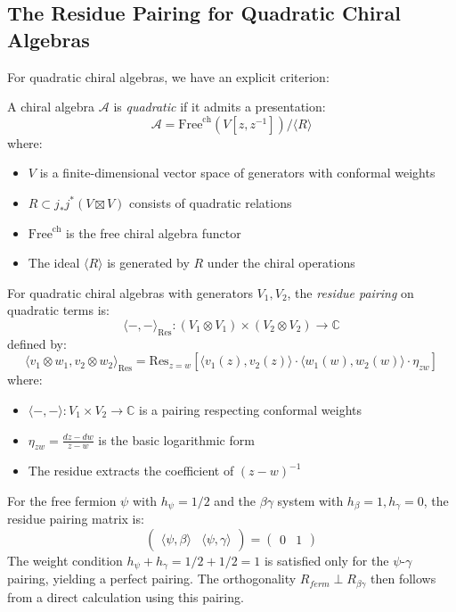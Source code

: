 \subsection{The Residue Pairing for Quadratic Chiral Algebras}
 
For quadratic chiral algebras, we have an explicit criterion:
 
\begin{definition}\label{def:quadratic-chiral}
A chiral algebra $\mathcal{A}$ is \emph{quadratic} if it admits a presentation:
\[
\mathcal{A} = \text{Free}^{\text{ch}}(V[z,z^{-1}])/\langle R \rangle
\]
where:
\begin{itemize}
\item $V$ is a finite-dimensional vector space of generators with conformal weights
\item $R \subset j_*j^*(V \boxtimes V)$ consists of quadratic relations  
\item $\text{Free}^{\text{ch}}$ is the free chiral algebra functor
\item The ideal $\langle R \rangle$ is generated by $R$ under the chiral operations
\end{itemize}
\end{definition}
 
\begin{definition}\label{def:residue-pairing}
For quadratic chiral algebras with generators $V_1, V_2$, the \emph{residue pairing} on quadratic terms is:
\[
\langle -, - \rangle_{\text{Res}}: (V_1 \otimes V_1) \times (V_2 \otimes V_2) \to \mathbb{C}
\]
defined by:
\[
\langle v_1 \otimes w_1, v_2 \otimes w_2 \rangle_{\text{Res}} = 
\text{Res}_{z=w}\left[\langle v_1(z), v_2(z) \rangle \cdot \langle w_1(w), w_2(w) \rangle \cdot \eta_{zw}\right]
\]
where:
\begin{itemize}
\item $\langle -, - \rangle: V_1 \times V_2 \to \mathbb{C}$ is a pairing respecting conformal weights
\item $\eta_{zw} = \frac{dz - dw}{z - w}$ is the basic logarithmic form
\item The residue extracts the coefficient of $(z-w)^{-1}$
\end{itemize}
\end{definition}

\begin{example} For the free fermion $\psi$ with $h_\psi = 1/2$ and the $\beta\gamma$ system with $h_\beta = 1, h_\gamma = 0$, the residue pairing matrix is:
$$\begin{pmatrix} \langle\psi,\beta\rangle & \langle\psi,\gamma\rangle \end{pmatrix} = \begin{pmatrix} 0 & 1 \end{pmatrix}$$
The weight condition $h_\psi + h_\gamma = 1/2 + 1/2 = 1$ is satisfied only for the $\psi$-$\gamma$ pairing, yielding a perfect pairing. The orthogonality $R_{ferm} \perp R_{\beta\gamma}$ then follows from a direct calculation using this pairing.
\end{example}

